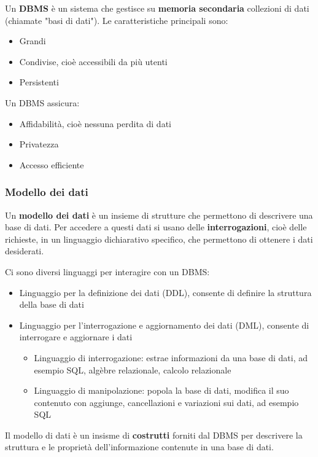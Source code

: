 \documentclass[a4paper]{article}
\begin{document}
\begin{definition}
  Un \textbf{DBMS} è un sistema che gestisce su \textbf{memoria secondaria} collezioni
  di dati (chiamate "basi di dati"). Le caratteristiche principali sono:
  \begin{itemize}
    \item Grandi
    \item Condivise, cioè accessibili da più utenti
    \item Persistenti
  \end{itemize}
  Un DBMS assicura:
  \begin{itemize}
    \item Affidabilità, cioè nessuna perdita di dati
    \item Privatezza
    \item Accesso efficiente
  \end{itemize}
\end{definition}

\subsubsection{Modello dei dati}
Un \textbf{modello dei dati} è un insieme di strutture che permettono di descrivere
una base di dati. Per accedere a questi dati si usano delle \textbf{interrogazioni},
cioè delle richieste, in un linguaggio dichiarativo specifico, che permettono di ottenere
i dati desiderati.

Ci sono diversi linguaggi per interagire con un DBMS:
\begin{itemize}
  \item Linguaggio per la definizione dei dati (DDL), consente di definire la struttura
    della base di dati
  \item Linguaggio per l'interrogazione e aggiornamento dei dati (DML), consente
    di interrogare e aggiornare i dati
    \begin{itemize}
      \item Linguaggio di interrogazione: estrae informazioni da una base di dati,
        ad esempio SQL, algèbre relazionale, calcolo relazionale
      \item Linguaggio di manipolazione: popola la base di dati, modifica il suo contenuto
        con aggiunge, cancellazioni e variazioni sui dati, ad esempio SQL
    \end{itemize}
\end{itemize}

Il modello di dati è un insisme di \textbf{costrutti} forniti dal DBMS per descrivere la
struttura e le proprietà dell'informazione contenute in una base di dati.
\end{document}
